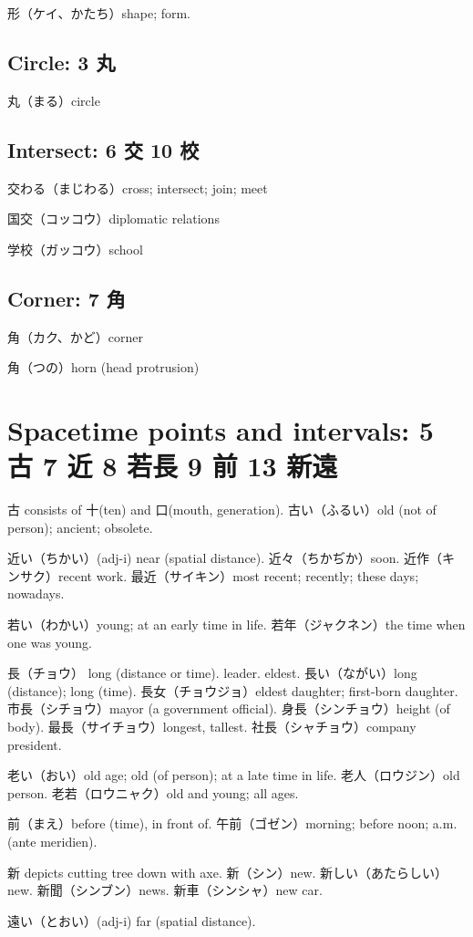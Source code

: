 形（ケイ、かたち）shape; form.

\subsection{Circle: 3 丸}

丸（まる）circle

\subsection{Intersect: 6 交 10 校}

交わる（まじわる）cross; intersect; join; meet

国交（コッコウ）diplomatic relations

学校（ガッコウ）school

\subsection{Corner: 7 角}

角（カク、かど）corner

角（つの）horn (head protrusion)

\section{Spacetime points and intervals: 5 古 7 近 8 若長 9 前 13 新遠}

古 consists of 十(ten) and 口(mouth, generation).
古い（ふるい）old (not of person); ancient; obsolete.

近い（ちかい）(adj-i) near (spatial distance).
近々（ちかぢか）soon.
近作（キンサク）recent work.
最近（サイキン）most recent; recently; these days; nowadays.

若い（わかい）young; at an early time in life.
若年（ジャクネン）the time when one was young.

長（チョウ）
long (distance or time).
leader.
eldest.
長い（ながい）long (distance); long (time).
長女（チョウジョ）eldest daughter; first-born daughter.
市長（シチョウ）mayor (a government official).
身長（シンチョウ）height (of body).
最長（サイチョウ）longest, tallest.
社長（シャチョウ）company president.

老い（おい）old age; old (of person); at a late time in life.
老人（ロウジン）old person.
老若（ロウニャク）old and young; all ages.

前（まえ）before (time), in front of.
午前（ゴゼン）morning; before noon; a.m. (ante meridien).

新 depicts cutting tree down with axe.
新（シン）new.
新しい（あたらしい）new.
新聞（シンブン）news.
新車（シンシャ）new car.

遠い（とおい）(adj-i) far (spatial distance).
